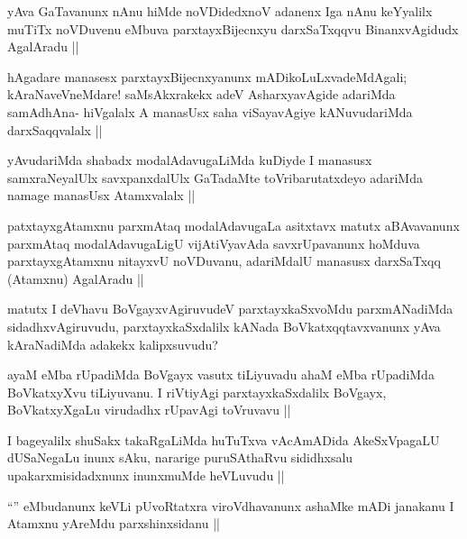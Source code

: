 \begin{artha}
yAva GaTavanunx nAnu hiMde noVDidedxnoV adanenx Iga nAnu keYyalilx muTiTx noVDuvenu eMbuva parxtayxBijecnxyu darxSaTxqqvu BinanxvAgidudx AgalAradu ||  
\end{artha}

\begin{artha}
hAgadare manasesx parxtayxBijecnxyanunx mADikoLuLxvadeMdAgali; kAraNaveVneMdare! saMsAkxrakekx adeV AsharxyavAgide adariMda samAdhAna- hiVgalalx A manasUsx saha viSayavAgiye kANuvudariMda darxSaqqvalalx ||
\end{artha}

\begin{artha}
yAvudariMda shabadx modalAdavugaLiMda kuDiyde I manasusx samxraNeyalUlx savxpanxdalUlx GaTadaMte toVribarutatxdeyo adariMda namage manasUsx Atamxvalalx ||
\end{artha}

\begin{artha}
patxtayxgAtamxnu parxmAtaq modalAdavugaLa asitxtavx matutx aBAvavanunx parxmAtaq modalAdavugaLigU vijAtiVyavAda savxrUpavanunx hoMduva parxtayxgAtamxnu nitayxvU noVDuvanu, adariMdalU manasusx darxSaTxqq (Atamxnu) AgalAradu ||
\end{artha}

\begin{artha}
matutx I deVhavu BoVgayxvAgiruvudeV parxtayxkaSxvoMdu parxmANadiMda sidadhxvAgiruvudu, parxtayxkaSxdalilx kANada BoVkatxqqtavxvanunx yAva kAraNadiMda adakekx kalipxsuvudu?
\end{artha}

\begin{artha}
ayaM eMba rUpadiMda BoVgayx vasutx tiLiyuvadu ahaM eMba rUpadiMda BoVkatxyXvu tiLiyuvanu. I riVtiyAgi parxtayxkaSxdalilx BoVgayx, BoVkatxyXgaLu virudadhx rUpavAgi toVruvavu ||
\end{artha}

\begin{artha}
I bageyalilx shuSakx takaRgaLiMda huTuTxva vAcAmADida AkeSxVpagaLU dUSaNegaLu inunx sAku, nararige puruSAthaRvu sididhxsalu upakarxmisidadxnunx inunxmuMde heVLuvudu ||
\end{artha}

\begin{artha}
``\stext'' eMbudanunx keVLi pUvoRtatxra viroVdhavanunx ashaMke mADi janakanu I Atamxnu yAreMdu parxshinxsidanu ||
\end{artha}

